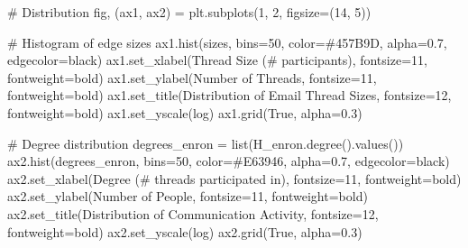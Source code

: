 \documentclass[
  11pt,
  letterpaper,
  oneside,
  openany]{book}
\newenvironment{Shaded}{\begin{snugshade}}{\end{snugshade}}
\newcommand{\BuiltInTok}[1]{\textcolor[rgb]{0.00,0.23,0.31}{#1}}
\newcommand{\CommentTok}[1]{\textcolor[rgb]{0.37,0.37,0.37}{#1}}
\newcommand{\DecValTok}[1]{\textcolor[rgb]{0.68,0.00,0.00}{#1}}
\newcommand{\FloatTok}[1]{\textcolor[rgb]{0.68,0.00,0.00}{#1}}
\newcommand{\NormalTok}[1]{\textcolor[rgb]{0.00,0.23,0.31}{#1}}
\newcommand{\OperatorTok}[1]{\textcolor[rgb]{0.37,0.37,0.37}{#1}}
\newcommand{\StringTok}[1]{\textcolor[rgb]{0.13,0.47,0.30}{#1}}
\newcommand{\VariableTok}[1]{\textcolor[rgb]{0.07,0.07,0.07}{#1}}
\begin{document}
\begin{Shaded}
\begin{Highlighting}[]
\CommentTok{\# Distribution}
\NormalTok{fig, (ax1, ax2) }\OperatorTok{=}\NormalTok{ plt.subplots(}\DecValTok{1}\NormalTok{, }\DecValTok{2}\NormalTok{, figsize}\OperatorTok{=}\NormalTok{(}\DecValTok{14}\NormalTok{, }\DecValTok{5}\NormalTok{))}

\CommentTok{\# Histogram of edge sizes}
\NormalTok{ax1.hist(sizes, bins}\OperatorTok{=}\DecValTok{50}\NormalTok{, color}\OperatorTok{=}\StringTok{\textquotesingle{}\#457B9D\textquotesingle{}}\NormalTok{, alpha}\OperatorTok{=}\FloatTok{0.7}\NormalTok{, edgecolor}\OperatorTok{=}\StringTok{\textquotesingle{}black\textquotesingle{}}\NormalTok{)}
\NormalTok{ax1.set\_xlabel(}\StringTok{\textquotesingle{}Thread Size (\# participants)\textquotesingle{}}\NormalTok{, fontsize}\OperatorTok{=}\DecValTok{11}\NormalTok{, fontweight}\OperatorTok{=}\StringTok{\textquotesingle{}bold\textquotesingle{}}\NormalTok{)}
\NormalTok{ax1.set\_ylabel(}\StringTok{\textquotesingle{}Number of Threads\textquotesingle{}}\NormalTok{, fontsize}\OperatorTok{=}\DecValTok{11}\NormalTok{, fontweight}\OperatorTok{=}\StringTok{\textquotesingle{}bold\textquotesingle{}}\NormalTok{)}
\NormalTok{ax1.set\_title(}\StringTok{\textquotesingle{}Distribution of Email Thread Sizes\textquotesingle{}}\NormalTok{, fontsize}\OperatorTok{=}\DecValTok{12}\NormalTok{, fontweight}\OperatorTok{=}\StringTok{\textquotesingle{}bold\textquotesingle{}}\NormalTok{)}
\NormalTok{ax1.set\_yscale(}\StringTok{\textquotesingle{}log\textquotesingle{}}\NormalTok{)}
\NormalTok{ax1.grid(}\VariableTok{True}\NormalTok{, alpha}\OperatorTok{=}\FloatTok{0.3}\NormalTok{)}

\CommentTok{\# Degree distribution}
\NormalTok{degrees\_enron }\OperatorTok{=} \BuiltInTok{list}\NormalTok{(H\_enron.degree().values())}
\NormalTok{ax2.hist(degrees\_enron, bins}\OperatorTok{=}\DecValTok{50}\NormalTok{, color}\OperatorTok{=}\StringTok{\textquotesingle{}\#E63946\textquotesingle{}}\NormalTok{, alpha}\OperatorTok{=}\FloatTok{0.7}\NormalTok{, edgecolor}\OperatorTok{=}\StringTok{\textquotesingle{}black\textquotesingle{}}\NormalTok{)}
\NormalTok{ax2.set\_xlabel(}\StringTok{\textquotesingle{}Degree (\# threads participated in)\textquotesingle{}}\NormalTok{, fontsize}\OperatorTok{=}\DecValTok{11}\NormalTok{, fontweight}\OperatorTok{=}\StringTok{\textquotesingle{}bold\textquotesingle{}}\NormalTok{)}
\NormalTok{ax2.set\_ylabel(}\StringTok{\textquotesingle{}Number of People\textquotesingle{}}\NormalTok{, fontsize}\OperatorTok{=}\DecValTok{11}\NormalTok{, fontweight}\OperatorTok{=}\StringTok{\textquotesingle{}bold\textquotesingle{}}\NormalTok{)}
\NormalTok{ax2.set\_title(}\StringTok{\textquotesingle{}Distribution of Communication Activity\textquotesingle{}}\NormalTok{, fontsize}\OperatorTok{=}\DecValTok{12}\NormalTok{, fontweight}\OperatorTok{=}\StringTok{\textquotesingle{}bold\textquotesingle{}}\NormalTok{)}
\NormalTok{ax2.set\_yscale(}\StringTok{\textquotesingle{}log\textquotesingle{}}\NormalTok{)}
\NormalTok{ax2.grid(}\VariableTok{True}\NormalTok{, alpha}\OperatorTok{=}\FloatTok{0.3}\NormalTok{)}


\end{Highlighting}
\end{Shaded}
\end{document}

